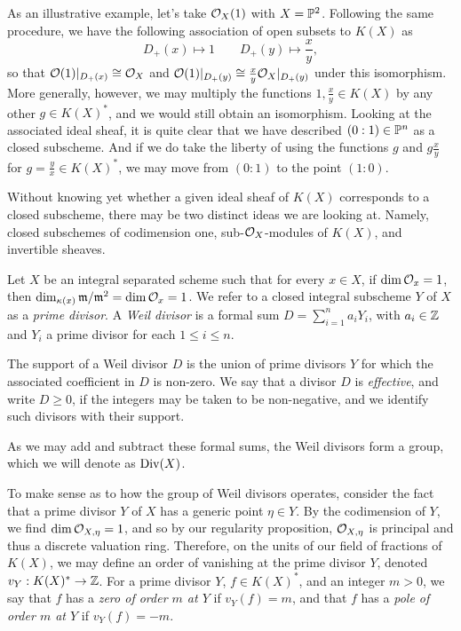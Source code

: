As an illustrative example, let's take $\mathcal{O}_X(1)$ with $X = \mathbb{P}^2$.
Following the same procedure, we have the following association of open subsets to $K(X)$ as
\[
    D_+(x) \mapsto 1 \qquad D_+(y) \mapsto \frac{x}{y},
\]
so that $\mathcal{O}(1)|_{D_+(x)} \cong \mathcal{O}_X$ and $\mathcal{O}(1)|_{D_+(y)} \cong \frac{x}{y} \mathcal{O}_X|_{D_+(y)}$ under this isomorphism.
More generally, however, we may multiply the functions $1, \frac{x}{y} \in K(X)$ by any other $g \in K(X)^*$,
and we would still obtain an isomorphism.
Looking at the associated ideal sheaf,
it is quite clear that we have described $(0 : 1) \in \mathbb{P}^n$ as a closed subscheme.
And if we do take the liberty of using the functions $g$ and $g\tfrac{x}{y}$ for $g = \tfrac{y}{x} \in K(X)^*$,
we may move from $(0 : 1)$ to the point $(1 : 0)$.

Without knowing yet whether a given ideal sheaf of $K(X)$ corresponds to a closed subscheme,
there may be two distinct ideas we are looking at.
Namely, closed subschemes of codimension one, sub-$\mathcal{O}_X$-modules of $K(X)$, and invertible sheaves.

\begin{definition}
    Let $X$ be an integral separated scheme such that for every $x \in X$,
    if $\dim \mathcal{O}_x = 1$, then $\dim_{\kappa(x)} \mathfrak{m} / \mathfrak{m}^2 = \dim \mathcal{O}_x = 1$.
    We refer to a closed integral subscheme $Y$ of $X$ as a \textit{prime divisor}.
    A \textit{Weil divisor} is a formal sum $D = \sum_{i = 1}^n a_i Y_i$,
    with $a_i \in \mathbb{Z}$ and $Y_i$ a prime divisor for each $1 \leq i \leq n$.
    
    The support of a Weil divisor $D$ is the union of prime divisors $Y$ for which the associated coefficient in $D$ is non-zero.
    We say that a divisor $D$ is \textit{effective}, and write $D \geq 0$, if the integers may be taken to be non-negative,
    and we identify such divisors with their support.


    As we may add and subtract these formal sums,
    the Weil divisors form a group, which we will denote as ${\rm Div}(X)$.
\end{definition}

To make sense as to how the group of Weil divisors operates,
consider the fact that a prime divisor $Y$ of $X$ has a generic point $\eta \in Y$.
By the codimension of $Y$, we find $\dim \mathcal{O}_{X, \eta} = 1$,
and so by our regularity proposition,
$\mathcal{O}_{X, \eta}$ is principal and thus a discrete valuation ring.
Therefore, on the units of our field of fractions of $K(X)$,
we may define an order of vanishing at the prime divisor $Y$,
denoted $v_Y : K(X)^* \to \mathbb{Z}$.
For a prime divisor $Y$, $f \in K(X)^*$, and an integer $m > 0$,
we say that $f$ has a \textit{zero of order $m$ at $Y$} if $v_Y(f) = m$,
and that $f$ has a \textit{pole of order $m$ at $Y$} if $v_Y(f) = -m$. 

